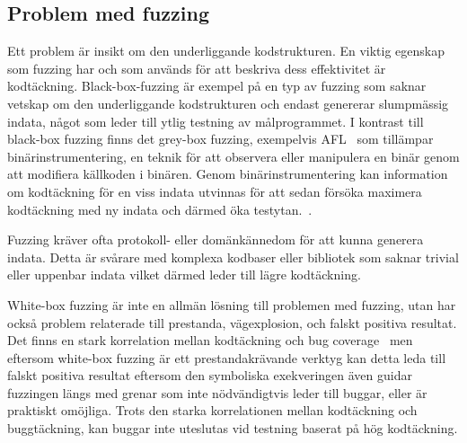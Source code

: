 \subsection{Problem med fuzzing} Ett problem är insikt om den underliggande
kodstrukturen. En viktig egenskap som fuzzing har och som används för att beskriva dess
effektivitet är kodtäckning. Black-box-fuzzing är exempel på en typ av fuzzing som
saknar vetskap om den underliggande kodstrukturen och endast genererar
slumpmässig indata, något som leder till ytlig testning av målprogrammet. I
kontrast till black-box fuzzing finns det grey-box fuzzing, exempelvis
AFL~\cite{aflplusplus} som tillämpar binärinstrumentering, en
teknik för att observera eller manipulera en binär genom att modifiera källkoden
i binären. Genom binärinstrumentering kan information om kodtäckning 
för en viss indata utvinnas för att sedan försöka maximera kodtäckning med ny indata
och därmed öka testytan.~\cite{challenges_fuzzing}.


Fuzzing kräver ofta protokoll- eller domänkännedom för att kunna generera
indata. Detta är svårare med komplexa kodbaser eller bibliotek som saknar
trivial eller uppenbar indata vilket därmed leder till lägre kodtäckning.

White-box fuzzing är inte en allmän lösning till problemen med fuzzing, utan
har också problem relaterade till prestanda, vägexplosion, och falskt positiva
resultat. Det finns en stark korrelation mellan kodtäckning och bug
coverage~\cite{directed_greybox_fuzzing} men eftersom white-box fuzzing är ett
prestandakrävande verktyg kan detta leda till falskt positiva resultat eftersom den
symboliska exekveringen även guidar fuzzingen längs med grenar som
inte nödvändigtvis leder till buggar, eller är praktiskt omöjliga.
Trots den starka korrelationen mellan kodtäckning och buggtäckning, kan buggar inte uteslutas vid
testning baserat på hög kodtäckning.


